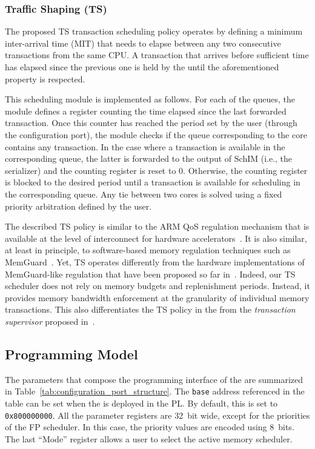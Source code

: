 \subsubsection{Traffic Shaping (TS)}
The proposed TS transaction scheduling policy operates by defining a
minimum inter-arrival time (MIT) that needs to elapse between any two
consecutive transactions from the same CPU. A transaction that arrives
before sufficient time has elapsed since the previous one is held by
the \schim until the aforementioned property is respected.

This scheduling module is implemented as follows. For each of the
\schim queues, the module defines a register counting the time elapsed
since the last forwarded transaction. Once this counter has reached
the period set by the user (through the configuration port), the
module checks if the queue corresponding to the core contains any
transaction. In the case where a transaction is available in the
corresponding queue, the latter is forwarded to the output of SchIM
(i.e., the serializer) and the counting register is reset to
0. Otherwise, the counting register is blocked to the desired period
until a transaction is available for scheduling in the corresponding
queue. Any tie between two cores is solved using a fixed priority
arbitration defined by the user.

The described TS policy is similar to the ARM QoS regulation mechanism
that is available at the level of interconnect for hardware
accelerators~\cite{qos-400, ewarp2020rtss}. It is also similar, at
least in principle, to software-based memory regulation techniques
such as MemGuard~\cite{memguard2013}. Yet, TS operates differently
from the hardware implementations of MemGuard-like regulation that
have been proposed so far in~\cite{zhou2016mitts,
  Farshchi2020BRUBR}. Indeed, our TS scheduler does not rely on memory
budgets and replenishment periods. Instead, it provides memory
bandwidth enforcement at the granularity of individual memory
transactions. This also differentiates the TS policy in the \schim
from the \emph{transaction supervisor} proposed
in~\cite{fred_hyperconnect}.

\subsection{Programming Model}
The parameters that compose the programming interface of the \schim
are summarized in Table~\ref{tab:configuration_port_structure}. The
\texttt{base} address referenced in the table can be set when the
\schim is deployed in the PL. By default, this is set to
\texttt{0x800000000}. All the parameter registers are 32~bit wide,
except for the priorities of the FP scheduler. In this case, the
priority values are encoded using 8~bits. The last ``Mode'' register
allows a user to select the active memory scheduler.

